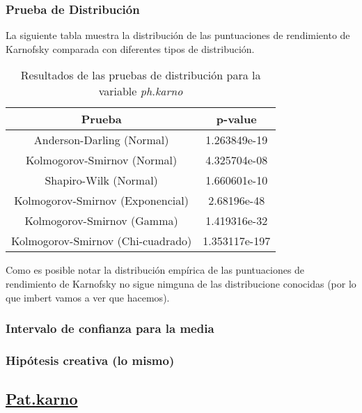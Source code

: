 \documentclass[a4paper,12pt]{article}
\begin{document}
\subsubsection*{Prueba de Distribución}

La siguiente tabla muestra la distribución de las puntuaciones de rendimiento de Karnofsky comparada con diferentes tipos de distribución.

\clearpage

\begin{table}[h!]
    \centering
    \begin{tabular}{|c|c|}
        \hline
        \textbf{Prueba} & \textbf{p-value} \\
        \hline
        Anderson-Darling (Normal) & 1.263849e-19 \\
        \hline
        Kolmogorov-Smirnov (Normal) & 4.325704e-08 \\
        \hline
        Shapiro-Wilk (Normal) & 1.660601e-10 \\
        \hline
        Kolmogorov-Smirnov (Exponencial) & 2.68196e-48 \\
        \hline
        Kolmogorov-Smirnov (Gamma) & 1.419316e-32 \\
        \hline
        Kolmogorov-Smirnov (Chi-cuadrado) & 1.353117e-197 \\
        \hline
    \end{tabular}
    \caption{Resultados de las pruebas de distribución para la variable \textit{ph.karno}}
    \label{tab:pruebas_distribucion_ph_karno}
\end{table}

    Como es posible notar la distribución empírica de las puntuaciones de rendimiento de Karnofsky no sigue nimguna de las distribucione conocidas (por lo que imbert vamos a ver que hacemos).

    \subsubsection*{Intervalo de confianza para la media}

    \subsubsection{Hipótesis creativa (lo mismo)}

    \subsection*{\underline{Pat.karno}}
\end{document}
